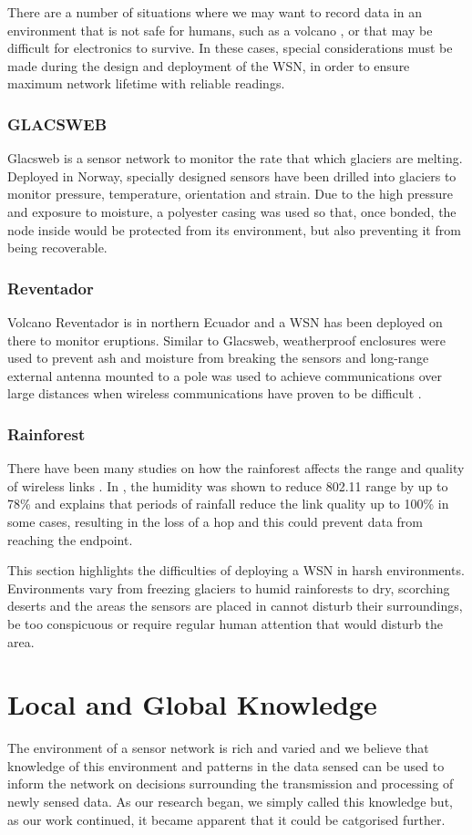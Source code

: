 		There are a number of situations where we may want to record data in an environment that is not safe for humans, such as a volcano \cite{Werner-Allen2006}, or that may be difficult for electronics to survive. In these cases, special considerations must be made during the design and deployment of the WSN, in order to ensure maximum  network lifetime with reliable readings.
	\subsubsection{GLACSWEB}
	Glacsweb is a sensor network to monitor the rate that which glaciers are melting. Deployed in Norway, specially designed sensors have been drilled into glaciers to monitor pressure, temperature, orientation and strain. Due to the high pressure and exposure to moisture, a polyester casing was used so that, once bonded, the node inside would be protected from its environment, but also preventing it from being recoverable.
	\subsubsection{Reventador}
	Volcano Reventador is in northern Ecuador and a WSN has been deployed on there to monitor eruptions. Similar to Glacsweb, weatherproof enclosures were used to prevent ash and moisture from breaking the sensors and long-range external antenna mounted to a pole was used to achieve communications over large distances when wireless communications have proven to be difficult \cite{Werner-Allen2006}.
	\subsubsection{Rainforest}
	There have been many studies on how the rainforest affects the range and quality of wireless links \cite{Figueiredo2009, Wark2008, Rahman2008}. In \cite{Figueiredo2009}, the humidity was shown to reduce 802.11 range by up to 78\% and \cite{Wark2008} explains that periods of rainfall reduce the link quality up to 100\% in some cases, resulting in the loss of a hop and this could prevent data from reaching the endpoint.


This section highlights the difficulties of deploying a WSN in harsh environments. Environments vary from freezing glaciers to humid rainforests to dry, scorching deserts and the areas the sensors are placed in cannot disturb their surroundings, be too conspicuous or require regular human attention that would disturb the area. 

\section{Local and Global Knowledge} \label{bg:lgk}
	The environment of a sensor network is rich and varied and we believe that knowledge of this environment and patterns in the data sensed can be used to inform the network on decisions surrounding the transmission and processing of newly sensed data. As our research began, we simply called this knowledge but, as our work continued, it became apparent that it could be catgorised further.

